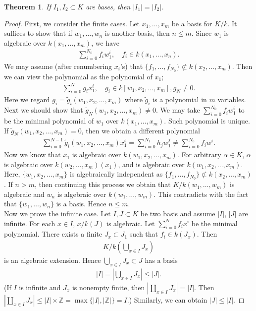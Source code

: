 \documentclass[12pt]{report}
\theoremstyle{plain}
\newtheorem{theorem}{Theorem}[section]
\theoremstyle{remark}
\theoremstyle{definition}
\newcommand{\Z}{\mathbb{Z}}
\begin{document}
\begin{theorem}
    If $I_1,I_2\subset K$ are bases, then $|I_1|=|I_2|$.
\end{theorem}
\begin{proof}
    First, we consider the finite cases. Let $x_1,\dots,x_m$ be a basis for $K/k$. It suffices to show that if $w_1,\dots,w_n$ is another basis, then $n\le m$. Since $w_1$ is algebraic over $k(x_1,\dots,x_m)$, we have
    \begin{align*}
        \sum_{i=0}^{N_0} f_i w_1^i,\quad f_i\in k(x_1,\dots,x_n).
    \end{align*}
    We may assume (after renumbering $x_i$'s) that $\{f_1,\dots,f_{N_0}\}\not\subset k(x_2,\dots,x_m)$. Then we can view the polynomial as the polynomial of $x_1$;
    \begin{align*}
        \sum_{i=0}^N g_i x_1^i,\quad g_i\in k[w_1,x_2,\dots,x_m],g_N\neq 0.
    \end{align*}
    Here we regard $g_i=\tilde{g}_i(w_1,x_2,\dots,x_m)$ where $\tilde{g}_i$ is a polynomial in $m$ variables. Next we should show that $\tilde{g}_N(w_1,x_2,\dots,x_m)\neq 0$. We may take $\sum_{i=0}^{N_0}f_iw_1^i$ to be the minimal polynomial of $w_1$ over $k(x_1,\dots,x_m)$. Such polynomial is unique. If $\tilde{g}_N(w_1,x_2,\dots,x_m)=0$, then we obtain a different polynomial
    \begin{align*}
        \sum_{i=0}^{N-1}\tilde{g}_i(w_1,x_2,\dots,x_m)x_1^i = \sum_{i=0}^{N_1} h_j w_1^j \neq \sum_{i=0}^{N_0}f_iw^i.
    \end{align*}
    Now we know that $x_1$ is algebraic over $k(w_1,x_2,\dots,x_m)$. For arbitrary $\alpha\in K$, $\alpha$ is algebraic over $k(w_2,\dots,x_m)(x_1)$, and is algebraic over $k(w_1,x_2,\dots,x_m)$. Here, $\{w_1,x_2,\dots,x_m\}$ is algebraically independent as $\{f_1,\dots,f_{N_0}\}\not\subset k(x_2,\dots,x_m)$. If $n>m$, then continuing this process we obtain that $K/k(w_1,\dots,w_m)$ is algebraic and $w_n$ is algebraic over $k(w_1,\dots,w_m)$. This contradicts with the fact that $\{w_1,\dots,w_n\}$ is a basis. Hence $n\le m$. \\
    Now we prove the infinite case. Let $I,J\subset K$ be two basis and assume $|I|$, $|J|$ are infinite. For each $x\in I$, $x/k(J)$ is algebraic. Let $\sum_{i=0}^N f_ix^i$ be the minimal polynomial. There exists a finite $J_x\subset J_1$ such that $f_i\in k(J_x)$. Then
    \begin{align*}
        K/k\left(\bigcup_{x\in I}J_x\right)
    \end{align*}
    is an algebraic extension. Hence $\bigcup_{x\in I}J_x\subset J$ has a basis
    \begin{align*}
        |I| = \left|\bigcup_{x\in I}J_x\right|\le |J|.
    \end{align*}
    (If $I$ is infinite and $J_x$ is nonempty finite, then $|\coprod_{x\in I}J_x|=|I|$. Then $|\coprod_{x\in I}J_x|\le |I|\times\Z=\max \{|I|,|\Z|\}=I$.) Similarly, we can obtain $|J|\le |I|$.
\end{proof}
\end{document}
